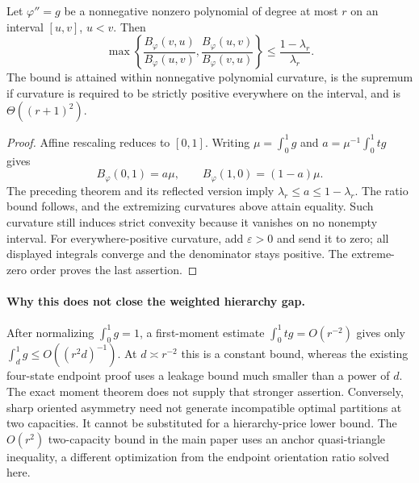 \begin{theorem}
Let $\varphi''=g$ be a nonnegative nonzero polynomial of degree at most
$r$ on an interval $[u,v]$, $u<v$. Then
\begin{equation}
 \max\left\{\frac{B_\varphi(v,u)}{B_\varphi(u,v)},
             \frac{B_\varphi(u,v)}{B_\varphi(v,u)}\right\}
 \le\frac{1-\lambda_r}{\lambda_r}.
 \label{eq:p9-exact-asymmetry}
\end{equation}
The bound is attained within nonnegative polynomial curvature, is the
supremum if curvature is required to be strictly positive everywhere on
the interval, and is $\Theta((r+1)^2)$.
\end{theorem}
\begin{proof}
Affine rescaling reduces to $[0,1]$. Writing
$\mu=\int_0^1g$ and $a=\mu^{-1}\int_0^1tg$ gives
\[
 B_\varphi(0,1)=a\mu,
 \qquad B_\varphi(1,0)=(1-a)\mu.
\]
The preceding theorem and its reflected version imply
$\lambda_r\le a\le1-\lambda_r$. The ratio bound follows, and the
extremizing curvatures above attain equality. Such curvature still
induces strict convexity because it vanishes on no nonempty interval.
For everywhere-positive curvature, add $\varepsilon>0$ and send it to
zero; all displayed integrals converge and the denominator stays positive.
The extreme-zero order proves the last assertion.
\end{proof}

\paragraph{Why this does not close the weighted hierarchy gap.}
After normalizing $\int_0^1g=1$, a first-moment estimate
$\int_0^1tg=O(r^{-2})$ gives only
$\int_d^1g\le O((r^2d)^{-1})$. At $d\asymp r^{-2}$ this is a
constant bound, whereas the existing four-state endpoint proof uses a
leakage bound much smaller than a power of $d$. The exact moment theorem
does not supply that stronger assertion. Conversely, sharp oriented
asymmetry need not generate incompatible optimal partitions at two
capacities. It cannot be substituted for a hierarchy-price lower bound.
The $O(r^2)$ two-capacity bound in the main paper uses an anchor
quasi-triangle inequality, a different optimization from the endpoint
orientation ratio solved here.
